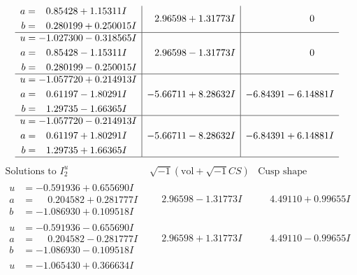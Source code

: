 \documentclass[1p]{elsarticle_modified}
\theoremstyle{definition}
\newcommand{\I}{\sqrt{-1}}
\begin{document}
$$\begin{array}{c|c|c}
\begin{aligned}
a &= \phantom{-}0.85428 + 1.15311 I \\
b &= \phantom{-}0.280199 + 0.250015 I\end{aligned}
 & \phantom{-}2.96598 + 1.31773 I & \phantom{-0.000000 } 0 \\ \hline\begin{aligned}
u &= -1.027300 - 0.318565 I \\
a &= \phantom{-}0.85428 - 1.15311 I \\
b &= \phantom{-}0.280199 - 0.250015 I\end{aligned}
 & \phantom{-}2.96598 - 1.31773 I & \phantom{-0.000000 } 0 \\ \hline\begin{aligned}
u &= -1.057720 + 0.214913 I \\
a &= \phantom{-}0.61197 - 1.80291 I \\
b &= \phantom{-}1.29735 - 1.66365 I\end{aligned}
 & -5.66711 + 8.28632 I & -6.84391 - 6.14881 I \\ \hline\begin{aligned}
u &= -1.057720 - 0.214913 I \\
a &= \phantom{-}0.61197 + 1.80291 I \\
b &= \phantom{-}1.29735 + 1.66365 I\end{aligned}
 & -5.66711 - 8.28632 I & -6.84391 + 6.14881 I\\
 \hline 
 \end{array}$$\newpage$$\begin{array}{c|c|c}  
\text{Solutions to }I^u_{2}& \I (\text{vol} + \sqrt{-1}CS) & \text{Cusp shape}\\
 \hline 
\begin{aligned}
u &= -0.591936 + 0.655690 I \\
a &= \phantom{-}0.204582 + 0.281777 I \\
b &= -1.086930 + 0.109518 I\end{aligned}
 & \phantom{-}2.96598 - 1.31773 I & \phantom{-}4.49110 + 0.99655 I \\ \hline\begin{aligned}
u &= -0.591936 - 0.655690 I \\
a &= \phantom{-}0.204582 - 0.281777 I \\
b &= -1.086930 - 0.109518 I\end{aligned}
 & \phantom{-}2.96598 + 1.31773 I & \phantom{-}4.49110 - 0.99655 I \\ \hline\begin{aligned}
u &= -1.065430 + 0.366634 I \\

\end{aligned}
\end{array}$$
\end{document}
